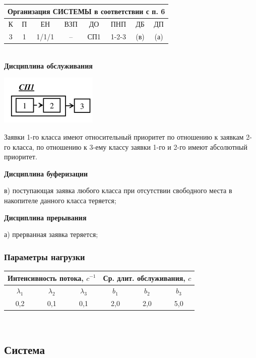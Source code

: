 \begin{tabular}{|c|c|c|c|c|c|c|c|}
\hline
\multicolumn{8}{|c|}{Организация СИСТЕМЫ в соответствии с п. 6} \\ \hline
К    & П    & ЕН      & ВЗП   & ДО    & ПНП     & ДБ    & ДП    \\ \hline
3    & 1    & 1/1/1   & --    & СП1   & 1-2-3   & (в)   & (а)   \\ \hline
\end{tabular}
\\

\textbf{Дисциплина обслуживания}

\includegraphics[resolution=128]{img/sd.png}

Заявки 1-го класса имеют относительный приоритет по отношению к заявкам 2-го
класса, по отношению к 3-ему классу заявки 1-го и 2-го имеют абсолютный приоритет.

\textbf{Дисциплина буферизации}

в) поступающая заявка любого класса при отсутствии свободного
места в накопителе данного класса теряется;

\textbf{Дисциплина прерывания}

а) прерванная заявка теряется;

\subsubsection{Параметры нагрузки}

\begin{tabular}{|c|c|c|c|c|c|}
\hline
\multicolumn{3}{|c|}{Интенсивность потока, $c^{-1}$} & \multicolumn{3}{c|}{Ср. длит. обслуживания, $c$} \\ \hline
$\lambda_1$      & $\lambda_2$     & $\lambda_3$     & $b_1$          & $b_2$          & $b_3$          \\ \hline
0,2              & 0,1             & 0,1             & 2,0            & 2,0            & 5,0            \\ \hline
\end{tabular}
\\

\subsection{Система}

